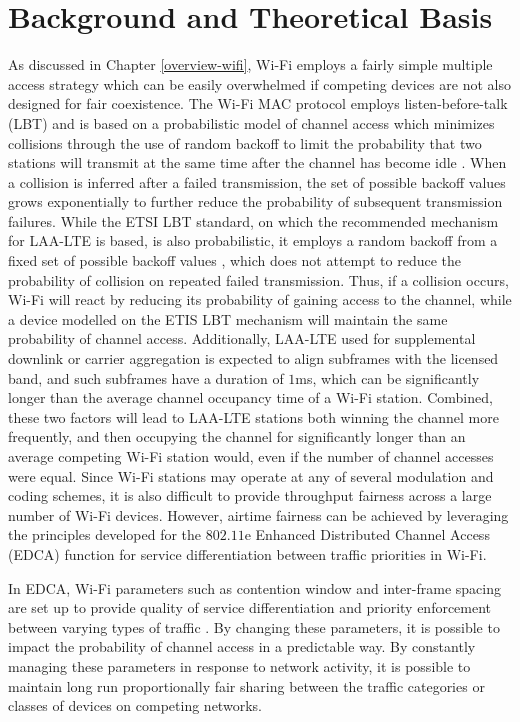 \section{Background and Theoretical Basis}
\label{background}
As discussed in Chapter \ref{overview-wifi}, \mbox{Wi-Fi} employs a fairly simple multiple access strategy which can be easily overwhelmed if competing devices are not also designed for fair coexistence. The \mbox{Wi-Fi} MAC protocol employs listen-before-talk (LBT) and is based on a probabilistic model of channel access which minimizes collisions through the use of random backoff to limit the probability that two stations will transmit at the same time after the channel has become idle \cite{80211}.  When a collision is inferred after a failed transmission, the set of possible backoff values grows exponentially to further reduce the probability of subsequent transmission failures.  While the ETSI LBT standard, on which the recommended mechanism for \mbox{LAA-LTE} is based, is also probabilistic, it employs a random backoff from a fixed set of possible backoff values \cite{3gpp}, which does not attempt to reduce the probability of collision on repeated failed transmission.  Thus, if a collision occurs, \mbox{Wi-Fi} will react by reducing its probability of gaining access to the channel, while a device modelled on the ETIS LBT mechanism will maintain the same probability of channel access.  Additionally, \mbox{LAA-LTE} used for supplemental downlink or carrier aggregation is expected to align subframes with the licensed band, and such subframes have a duration of $1$ms, which can be significantly longer than the average channel occupancy time of a Wi-Fi station.  Combined, these two factors will lead to \mbox{LAA-LTE} stations both winning the channel more frequently, and then occupying the channel for significantly longer than an average competing \mbox{Wi-Fi} station would, even if the number of channel accesses were equal.  Since \mbox{Wi-Fi} stations may operate at any of several modulation and coding schemes, it is also difficult to provide throughput fairness across a large number of Wi-Fi devices. However, airtime fairness can be achieved by leveraging the principles developed for the $802.11$e Enhanced Distributed Channel Access (EDCA) function for service differentiation between traffic priorities in Wi-Fi.  

In EDCA, \mbox{Wi-Fi} parameters such as contention window and inter-frame spacing are set up to provide quality of service differentiation and priority enforcement between varying types of traffic \cite{80211}.  By changing these parameters, it is possible to impact the probability of channel access in a predictable way.  By constantly managing these parameters in response to network activity, it is possible to maintain long run proportionally fair sharing between the traffic categories or classes of devices on competing networks.  

